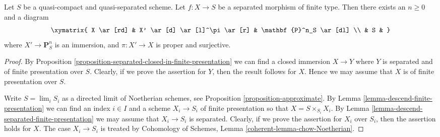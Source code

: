 \begin{lemma}
\label{lemma-chow-finite-type}
Let $S$ be a quasi-compact and quasi-separated scheme.
Let $f : X \to S$ be a separated morphism of finite type.
Then there exists an $n \geq 0$ and a diagram
$$
\xymatrix{
X \ar[rd] & X' \ar[d] \ar[l]^\pi \ar[r] & \mathbf{P}^n_S \ar[dl] \\
& S &
}
$$
where $X' \to \mathbf{P}^n_S$ is an immersion, and
$\pi : X' \to X$ is proper and surjective.
\end{lemma}

\begin{proof}
By Proposition \ref{proposition-separated-closed-in-finite-presentation}
we can find a closed immersion $X \to Y$ where $Y$ is separated
and of finite presentation over $S$. Clearly, if we prove the assertion
for $Y$, then the result follows for $X$. Hence we may assume that
$X$ is of finite presentation over $S$.

\medskip\noindent
Write $S = \lim_i S_i$ as a directed limit of Noetherian schemes, see
Proposition \ref{proposition-approximate}. By
Lemma \ref{lemma-descend-finite-presentation} we can
find an index $i \in I$ and a scheme $X_i \to S_i$ of finite presentation
so that $X = S \times_{S_i} X_i$.
By Lemma \ref{lemma-descend-separated-finite-presentation}
we may assume that $X_i \to S_i$ is separated.
Clearly, if we prove the assertion for
$X_i$ over $S_i$, then the assertion holds for $X$. The case
$X_i \to S_i$ is treated by
Cohomology of Schemes, Lemma \ref{coherent-lemma-chow-Noetherian}.
\end{proof}
